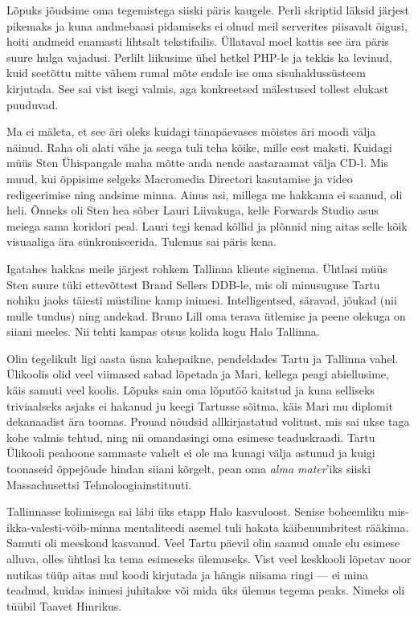Lõpuks jõudsime oma tegemistega siiski päris kaugele. Perli skriptid läksid 
järjest pikemaks ja kuna andmebaasi pidamiseks ei olnud meil serverites 
piisavalt õigusi, hoiti andmeid enamasti lihtsalt tekstifailis. Üllataval moel 
kattis see ära päris suure hulga vajadusi. Perlilt liikusime ühel hetkel PHP-le 
ja tekkis ka levinud, kuid seetõttu mitte vähem rumal mõte endale ise 
oma sisuhaldussüsteem kirjutada. See sai vist isegi valmis, aga konkreetsed 
mälestused tollest elukast puuduvad.

Ma ei mäleta, et see äri oleks kuidagi tänapäevases mõistes äri moodi välja 
näinud. Raha oli alati vähe ja seega tuli teha kõike, mille eest maksti. Kuidagi 
müüs Sten Ühispangale maha mõtte anda nende aastaraamat välja CD-l. Mis muud, kui
õppisime selgeks Macromedia Directori kasutamise ja video redigeerimise ning 
andsime minna. Ainus asi, millega me hakkama ei saanud, oli heli. Õnneks oli Sten 
hea sõber Lauri Liivakuga, kelle Forwards 
Studio asus meiega sama koridori peal. Lauri 
tegi kenad kõllid ja plõnnid ning aitas selle kõik visuaaliga ära 
sünkroniseerida. Tulemus sai päris kena. 

Igatahes hakkas meile järjest rohkem Tallinna kliente siginema. Ühtlasi müüs Sten 
suure tüki ettevõttest Brand Sellers DDB-le, mis oli 
minusuguse Tartu nohiku jaoks täiesti müstiline kamp inimesi. Intelligentsed, 
säravad, jõukad (nii mulle tundus) ning andekad. Bruno Lill oma terava ütlemise ja peene olekuga on siiani meeles. Nii tehti 
kampas otsus kolida kogu Halo Tallinna. 

Olin tegelikult ligi aasta üsna kahepaikne, pendeldades Tartu ja 
Tallinna vahel. Ülikoolis olid veel viimased sabad lõpetada ja 
Mari, kellega peagi abiellusime, käis samuti veel 
koolis. Lõpuks sain oma lõputöö kaitstud ja kuna selliseks triviaalseks asjaks ei 
hakanud ju keegi Tartusse sõitma, käis Mari mu diplomit dekanaadist ära toomas. 
Prouad nõudsid allkirjastatud volitust, mis sai ukse taga kohe valmis tehtud, 
ning nii omandasingi oma esimese teaduskraadi. Tartu Ülikooli peahoone 
sammaste vahelt ei ole ma kunagi välja astunud ja kuigi toonaseid õppejõude 
hindan siiani kõrgelt, pean oma \emph{alma mater}'iks siiski Massachusettsi 
Tehnoloogiainstituuti. 

Tallinnasse kolimisega sai läbi üks etapp Halo kasvuloost. Senise boheemliku 
mis-ikka-valesti-võib-minna mentaliteedi asemel tuli hakata käibenumbritest 
rääkima. Samuti oli meeskond kasvanud. Veel Tartu päevil olin saanud omale 
elu esimese alluva, olles ühtlasi ka tema esimeseks ülemuseks. Vist veel 
keskkooli lõpetav noor nutikas tüüp aitas mul koodi kirjutada ja hängis niisama 
ringi --- ei mina teadnud, kuidas inimesi juhitakse või mida üks ülemus tegema 
peaks. Nimeks oli tüübil Taavet Hinrikus. 

